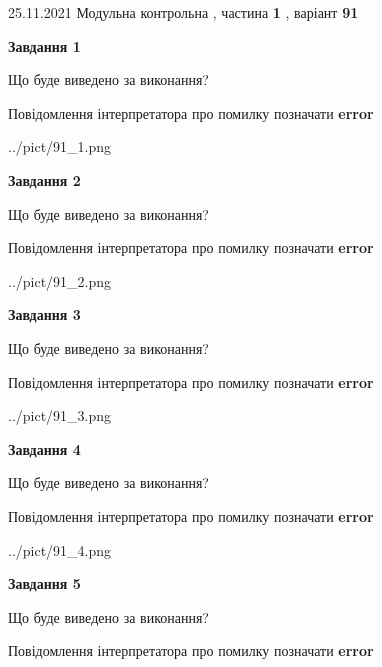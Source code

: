 \documentclass[10pt, ukrainian]{article}
\begin{document}
{25.11.2021 Модульна контрольна , частина \textbf { 1 }, варіант  \No \textbf { 91 }\par}
{
\begin {large}

{\begin {center}\textbf{Завдання 1}\end {center}}\par
Що буде виведено за виконання? \par
Повідомлення інтерпретатора про помилку позначати \textbf{error}

\begin{center}
	{../pict/91_1.png}
\end{center}
\newpage

{\begin {center}\textbf{Завдання 2}\end {center}}\par
Що буде виведено за виконання? \par
Повідомлення інтерпретатора про помилку позначати \textbf{error}

\begin{center}
	{../pict/91_2.png}
\end{center}
\newpage

{\begin {center}\textbf{Завдання 3}\end {center}}\par
Що буде виведено за виконання? \par
Повідомлення інтерпретатора про помилку позначати \textbf{error}

\begin{center}
	{../pict/91_3.png}
\end{center}
\newpage

{\begin {center}\textbf{Завдання 4}\end {center}}\par
Що буде виведено за виконання? \par
Повідомлення інтерпретатора про помилку позначати \textbf{error}

\begin{center}
	{../pict/91_4.png}
\end{center}
\newpage

{\begin {center}\textbf{Завдання 5}\end {center}}\par
Що буде виведено за виконання? \par
Повідомлення інтерпретатора про помилку позначати \textbf{error}


\end{large}}
\end{document}
